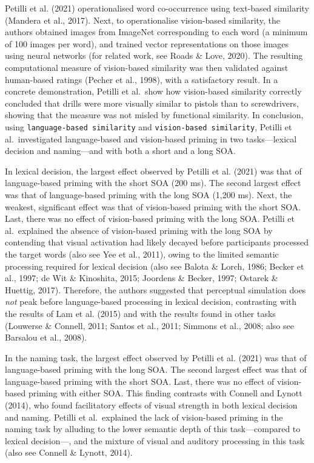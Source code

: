 \documentclass[
  12pt,
  man,floatsintext]{apa7}
\begin{document}
Petilli et al. (2021) operationalised word co-occurrence using text-based similarity (Mandera et al., 2017). Next, to operationalise vision-based similarity, the authors obtained images from ImageNet corresponding to each word (a minimum of 100 images per word), and trained vector representations on those images using neural networks (for related work, see Roads \& Love, 2020). The resulting computational measure of vision-based similarity was then validated against human-based ratings (Pecher et al., 1998), with a satisfactory result. In a concrete demonstration, Petilli et al.~show how vision-based similarity correctly concluded that drills were more visually similar to pistols than to screwdrivers, showing that the measure was not misled by functional similarity. In conclusion, using \texttt{language-based\ similarity} and \texttt{vision-based\ similarity}, Petilli et al.~investigated language-based and vision-based priming in two tasks---lexical decision and naming---and with both a short and a long SOA.

In lexical decision, the largest effect observed by Petilli et al. (2021) was that of language-based priming with the short SOA (200 ms). The second largest effect was that of language-based priming with the long SOA (1,200 ms). Next, the weakest, significant effect was that of vision-based priming with the short SOA. Last, there was no effect of vision-based priming with the long SOA. Petilli et al.~explained the absence of vision-based priming with the long SOA by contending that visual activation had likely decayed before participants processed the target words (also see Yee et al., 2011), owing to the limited semantic processing required for lexical decision (also see Balota \& Lorch, 1986; Becker et al., 1997; de Wit \& Kinoshita, 2015; Joordens \& Becker, 1997; Ostarek \& Huettig, 2017). Therefore, the authors suggested that perceptual simulation does \emph{not} peak before language-based processing in lexical decision, contrasting with the results of Lam et al. (2015) and with the results found in other tasks (Louwerse \& Connell, 2011; Santos et al., 2011; Simmons et al., 2008; also see Barsalou et al., 2008).

In the naming task, the largest effect observed by Petilli et al. (2021) was that of language-based priming with the long SOA. The second largest effect was that of language-based priming with the short SOA. Last, there was no effect of vision-based priming with either SOA. This finding contrasts with Connell and Lynott (2014), who found facilitatory effects of visual strength in both lexical decision and naming. Petilli et al.~explained the lack of vision-based priming in the naming task by alluding to the lower semantic depth of this task---compared to lexical decision---, and the mixture of visual and auditory processing in this task (also see Connell \& Lynott, 2014).
\end{document}
